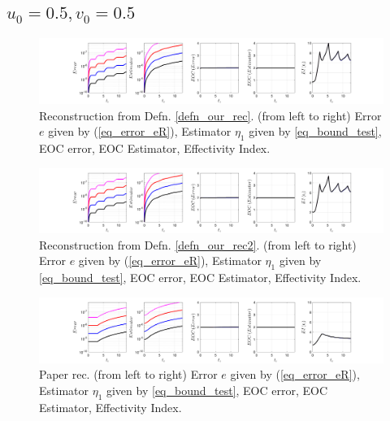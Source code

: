 \documentclass[12pt,a4paper]{article}
\numberwithin{equation}{section}
\theoremstyle{definition}
\begin{document}
\subsection*{$u_0=0.5, v_0= 0.5$}
\begin{figure}[H]
	\hspace{-3cm}
	\includegraphics[scale=0.55]{fig_LeapFrogplots_1x5_sin_IC_harmonic_order_2_u5_v5_rec_george}	
	\caption{Reconstruction from Defn. \ref{defn_our_rec}. (from left to right) Error $e$ given by (\ref{eq_error_eR}), Estimator $\eta_1$ given by \ref{eq_bound_test},   EOC error, EOC Estimator, Effectivity Index.}
	\label{fig_all_in_one_our_rec_george_u5_v5}
\end{figure}
\begin{figure}[H]
	\hspace{-3cm}
	\includegraphics[scale=0.55]{fig_LeapFrogplots_1x5_sin_IC_harmonic_order_2_u5_v5_rec2}	
	\caption{Reconstruction from Defn. \ref{defn_our_rec2}. (from left to right) Error $e$ given by (\ref{eq_error_eR}), Estimator $\eta_1$ given by \ref{eq_bound_test},  EOC error, EOC Estimator, Effectivity Index.}
	\label{fig_all_in_one_our_rec_2_u5_v5}
\end{figure}
\begin{figure}[H]
	\hspace{-3cm}
	\includegraphics[scale=0.55]{fig_LeapFrogplots_1x5_sin_IC_harmonic_u5_v5_paperrec}	
	\caption{Paper rec. (from left to right) Error $e$ given by (\ref{eq_error_eR}), Estimator $\eta_1$ given by \ref{eq_bound_test},   EOC error, EOC Estimator, Effectivity Index.}
	\label{fig_all_in_one_paperrec_u05_v05}
\end{figure}
\end{document}
